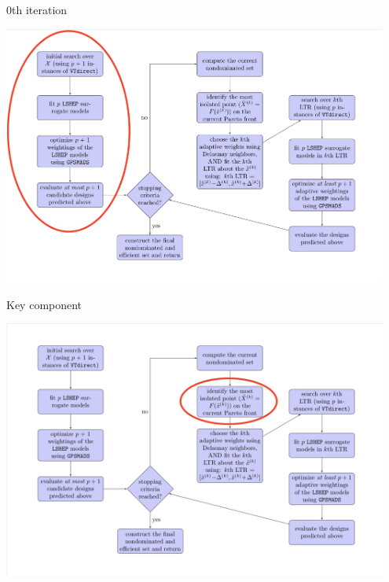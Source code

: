 \documentclass[xcolor=dvipsnames]{beamer}
\begin{document}
\begin{frame}{0th iteration}
\begin{center}
\includegraphics[width=0.95\textwidth]{0thit-chart.png}
\end{center}
\end{frame}
\begin{frame}{Key component}
\begin{center}
\includegraphics[width=0.95\textwidth]{isolated-chart.png}
\end{center}
\end{frame}
\end{document}
